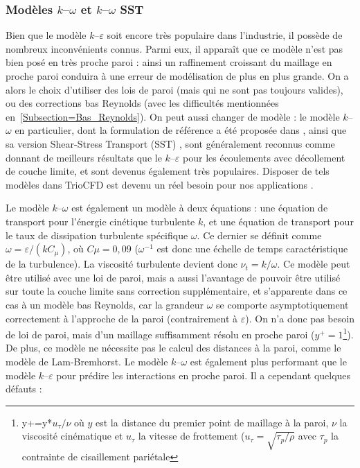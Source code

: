 \subsubsection{Mod\`eles $k$--$\omega$ et $k$--$\omega$ SST}

Bien que le mod\`ele $k$--$\varepsilon$ soit encore tr\`es populaire dans l'industrie, il poss\`ede de nombreux inconv\'enients connus. Parmi eux, il appara\^it que ce mod\`ele n'est pas bien pos\'e en tr\`es proche paroi : ainsi un raffinement croissant du maillage en proche paroi conduira \`a une erreur de mod\'elisation de plus en plus grande. On a alors le choix d'utiliser des lois de paroi (mais qui ne sont pas toujours valides), ou des corrections bas Reynolds (avec les difficult\'es mentionn\'ees en~\ref{Subsection=Bas_Reynolds}). On peut aussi changer de mod\`ele : le mod\`ele $k$--$\omega$ en particulier, dont la formulation de r\'ef\'erence a \'et\'e propos\'ee dans \cite{Wilcox1988}, ainsi que sa version {\og Shear-Stress Transport \fg} (SST) \cite{Menter1993}, sont g\'en\'eralement reconnus comme donnant de meilleurs r\'esultats que le $k$--$\varepsilon$ pour les \'ecoulements avec d\'ecollement de couche limite, et sont devenus \'egalement tr\`es populaires. Disposer de tels mod\`eles dans TrioCFD est devenu un r\'eel besoin pour nos applications \cite{Angeli2019a}.

Le mod\`ele $k$--$\omega$ est \'egalement un mod\`ele \`a deux \'equations : une \'equation de transport pour l'\'energie cin\'etique turbulente $k$, et une \'equation de transport pour le taux de dissipation turbulente sp\'ecifique $\omega$. Ce dernier se d\'efinit comme $\omega = \varepsilon/(k C_\mu)$, o\`u $C\mu = 0,09$ ($\omega^{-1}$ est donc une \'echelle de temps caract\'eristique de la turbulence). La viscosit\'e turbulente devient donc $\nu_t=k/\omega$. Ce mod\`ele peut \^etre utilis\'e avec une loi de paroi, mais a aussi l'avantage de pouvoir \^etre utilis\'e sur toute la couche limite sans correction suppl\'ementaire, et s'apparente dans ce cas \`a un mod\`ele bas Reynolds, car la grandeur $\omega$ se comporte asymptotiquement correctement \`a l'approche de la paroi (contrairement \`a $\varepsilon$). On n'a donc pas besoin de loi de paroi, mais d'un maillage suffisamment r\'esolu en proche paroi ($y^+ = 1$\footnote{y+=y*$u_\tau/\nu$ o\`u $y$ est la distance du premier point de maillage \`a la paroi, $\nu$ la viscosit\'e cin\'ematique et $u_\tau$ la vitesse de frottement ($u_\tau =\sqrt{\tau_p/\rho}$ avec $\tau_p$ la contrainte de cisaillement pari\'etale}). De plus, ce mod\`ele ne n\'ecessite pas le calcul des distances \`a la paroi, comme le mod\`ele de Lam-Bremhorst. Le mod\`ele $k$--$\omega$ est \'egalement plus performant que le mod\`ele $k$--$\varepsilon$ pour pr\'edire les interactions en proche paroi. Il a cependant quelques d\'efauts :\medskip

